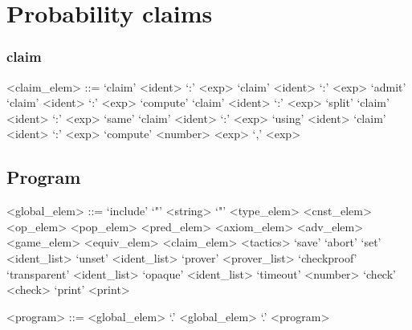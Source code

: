 \section{Probability claims}
\subsubsection*{claim}
\begin{ecgrammar}
<claim_elem> ::=  
      `claim' <ident> `:' <exp>
 \alt `claim' <ident> `:' <exp> `admit'
 \alt `claim' <ident> `:' <exp> `compute'
 \alt `claim' <ident> `:' <exp> `split'
 \alt `claim' <ident> `:' <exp> `same'
 \alt `claim' <ident> `:' <exp> `using' <ident>
 \alt `claim' <ident> `:' <exp> `compute' <number> <exp> `,' <exp>
\end{ecgrammar}


\subsection{Program}
\begin{ecgrammar}

<global_elem> ::=  `include' `"' <string> `"'          %
              \alt <type_elem>                         %
              \alt <cnst_elem>                         %
              \alt <op_elem>                           %
              \alt <pop_elem>                          %
              \alt <pred_elem>                         %
              \alt <axiom_elem>                        %
              \alt <adv_elem>                          %
              \alt <game_elem>                         %
              \alt <equiv_elem>                        %
              \alt <claim_elem>                        %
              \alt <tactics>                           %
              \alt `save'                              %
              \alt `abort'                             %
              \alt `set' <ident_list>                  %
              \alt `unset' <ident_list>                %
              \alt `prover' <prover_list>              %
              \alt `checkproof'                        %
              \alt `transparent' <ident_list>          %
              \alt `opaque' <ident_list>               %
              \alt `timeout' <number>                  %
              \alt `check' <check>                     %
              \alt `print' <print>                     %

<program> ::=  <global_elem> `.'
          \alt <global_elem> `.' <program>

\end{ecgrammar} 



